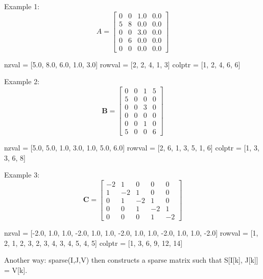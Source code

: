 Example 1:
\begin{equation}
A = \begin{bmatrix}
0  &  0  &  1.0 &  0.0 \\
5  &  8  &  0.0 &  0.0 \\
0  &  0  &  3.0 &  0.0 \\
0  &  6  &  0.0 &  0.0 \\
0  &  0  &  0.0 &  0.0
\end{bmatrix}
\end{equation}

\begin{textcode}
nzval = [5.0, 8.0, 6.0, 1.0, 3.0]
rowval = [2, 2, 4, 1, 3]
colptr = [1, 2, 4, 6, 6]
\end{textcode}

Example 2:
\begin{equation}
\mathbf{B} = \begin{bmatrix}
0  &  0  &  1  &  5 \\
5  &  0  &  0  &  0 \\
0  &  0  &  3  &  0 \\
0  &  0  &  0  &  0 \\
0  &  0  &  1  &  0 \\
5  &  0  &  0  &  6
\end{bmatrix}
\end{equation}

\begin{textcode}
nzval  = [5.0, 5.0, 1.0, 3.0, 1.0, 5.0, 6.0]
rowval = [2, 6, 1, 3, 5, 1, 6]
colptr = [1, 3, 3, 6, 8]
\end{textcode}

Example 3:
\begin{equation}
\mathbf{C} = \begin{bmatrix}
 -2  &  1  &  0  &  0  &  0 \\
  1  & -2  &  1  &  0  &  0 \\
  0  &  1  & -2  &  1  &  0 \\
  0  &  0  &  1  & -2  &  1 \\
  0  &  0  &  0  &  1  & -2
\end{bmatrix}
\end{equation}

\begin{textcode}
nzval  = [-2.0, 1.0, 1.0, -2.0, 1.0, 1.0, -2.0, 1.0, 1.0, -2.0, 1.0, 1.0, -2.0]
rowval = [1, 2, 1, 2, 3, 2, 3, 4, 3, 4, 5, 4, 5]
colptr = [1, 3, 6, 9, 12, 14]
\end{textcode}

Another way:
sparse(I,J,V) then constructs a sparse matrix such that S[I[k], J[k]] = V[k].

